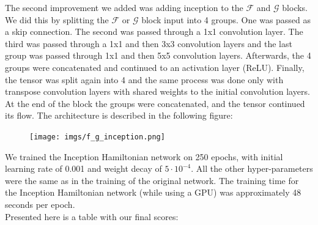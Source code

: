 \documentclass{article}
\theoremstyle{remark}
\begin{document}
The second improvement we added was adding inception to the $\mathcal{F}$ and $\mathcal{G}$ blocks. We did this by splitting the $\mathcal{F}$ or $\mathcal{G}$ block input into 4 groups. 
One was passed as a skip connection. The second was passed through a 1x1 convolution layer. The third was passed through a 1x1 and then 3x3 convolution layers and the last group was 
passed through 1x1 and then 5x5 convolution layers. Afterwards, the 4 groups were concatenated and continued to an activation layer (ReLU). Finally, the tensor was split again into 4 and 
the same process was done only with transpose convolution layers with shared weights to the initial convolution layers. At the end of the block the groups were concatenated, and the 
tensor continued its flow. The architecture is described in the following figure:
\begin{figure}[H]
    \centering
    \texttt{[image: imgs/f\_g\_inception.png]}
\end{figure} \par
We trained the Inception Hamiltonian network on 250 epochs, with initial learning rate of 0.001 and weight decay of $5\cdot 10^{-4}$. All the other hyper-parameters were the same as in 
the training of the original network. The training time for the Inception Hamiltonian network (while using a GPU) was approximately 48 seconds per epoch. \\

Presented here is a table with our final scores:
\end{document}
